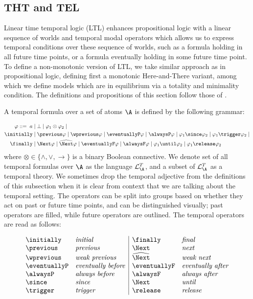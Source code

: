 \subsection{THT and TEL}\label{subsec:tht-tel}

Linear time temporal logic (LTL) enhances propositional logic with a
linear sequence of worlds and temporal modal operators which allows us
to express temporal conditions over these sequence of worlds, such as
a formula holding in all future time points, or a formula eventually
holding in some future time point. To define a non-monotonic version
of LTL, we take similar approach as in propositional logic, defining
first a monotonic Here-and-There variant, among which we define models
which are in equilibrium via a totality and minimality condition. The
definitions and propositions of this section follow those of
\citeauthor{agcadipescscvi20a}\cite{agcadipescscvi20a}.

A temporal formula over a set of atoms $\A$ is defined by the
following grammar:

\begin{align*}
    \varphi ::=   \; a &\mid \bot \mid \varphi_1 \otimes \varphi_2 \mid\\
  \initially &\mid \previous \varphi \mid \wprevious \varphi \mid \eventuallyP \varphi \mid
  \alwaysP \varphi \mid \varphi_1 \since \varphi_2 \mid \varphi_1 \trigger \varphi_2 \mid\\
  \finally &\mid \Next \varphi \mid \wnext \varphi \mid \eventuallyF \varphi \mid
  \alwaysF \varphi \mid \varphi_1 \until \varphi_2 \mid \varphi_1 \release \varphi_2
\end{align*}
where $\otimes \in \{ \wedge, \vee, \to \}$ is a binary Boolean
connective. We denote set of all temporal formulas over $\A$ as the
language $\mathcal{L}_{\A}^{T}$, and a subset of
$\mathcal{L}_{\A}^{T}$ as a temporal theory. We sometimes drop the
temporal adjective from the definitions of this subsection when it is
clear from context that we are talking about the temporal setting. The
operators can be split into groups based on whether they act on past
or future time points, and can be distinguished visually; past
operators are filled, while future operators are outlined. The
temporal operators are read as follows:

\[
  \begin{array}{l l|l l}
    \initially & \text{\emph{initial}} & \finally & \text{\emph{final}}\\
    \previous & \text{\emph{previous}} & \Next & \text{\emph{next}}\\
    \wprevious & \text{\emph{weak previous}} & \wnext & \text{\emph{weak next}}\\
    \eventuallyP & \text{\emph{eventually before}} & \eventuallyF & \text{\emph{eventually after}}\\
    \alwaysP & \text{\emph{always before}} & \alwaysF & \text{\emph{always after}}\\
    \since & \text{\emph{since}} & \Next & \text{\emph{until}}\\
    \trigger & \text{\emph{trigger}} & \release & \text{\emph{release}}
\end{array}
\]


